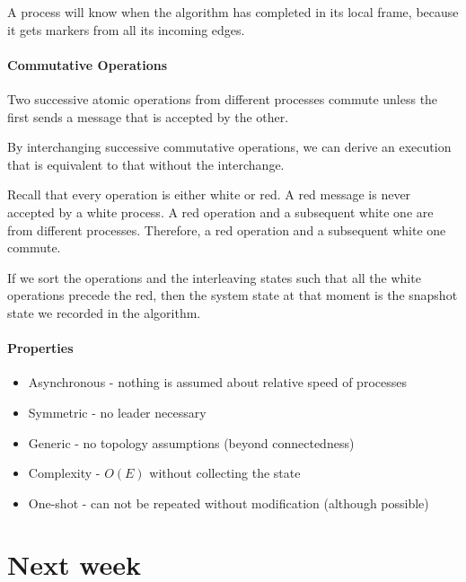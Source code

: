 \documentclass{idc_msc}
\begin{document}
A process will know when the algorithm has completed in its local frame, because it gets markers from all its incoming edges.

\paragraph{Commutative Operations}

Two successive atomic operations from different processes commute unless the first sends a message that is accepted by the other.

By interchanging successive commutative operations, we can derive an execution that is equivalent to that without the interchange.

Recall that every operation is either white or red.
A red message is never accepted by a white process.
A red operation and a subsequent white one are from different processes.
Therefore, a red operation and a subsequent white one commute.

If we sort the operations and the interleaving states such that all the white operations precede the red, then the system state at that moment is the snapshot state we recorded in the algorithm.

\paragraph{Properties}

\begin{itemize}
  \item Asynchronous - nothing is assumed about relative speed of processes
  \item Symmetric - no leader necessary
  \item Generic - no topology assumptions (beyond connectedness)
  \item Complexity - $O(E)$ without collecting the state
  \item One-shot - can not be repeated without modification (although possible)
\end{itemize}

\section{Next week}
\end{document}
